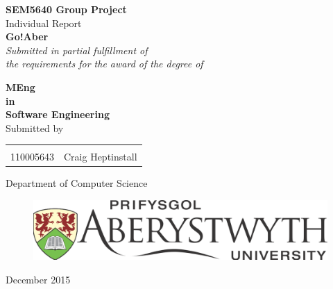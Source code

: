 \begin{titlepage}

\begin{center}

\textup{\small {\bf SEM5640 Group Project} \\ Individual Report}\\[0.2in]

\Large \textbf {Go!Aber}\\[0.5in]

       \small \emph{Submitted in partial fulfillment of\\
        the requirements for the award of the degree of}
        \vspace{.2in}

       {\bf MEng  \\in\\ Software Engineering}\\[0.5in]

\normalsize Submitted by \\
\begin{table}[h]
\centering
\begin{tabular}{lr}\hline \\
110005643 & Craig Heptinstall \\ \hline 
\end{tabular}
\end{table}

\vspace{.1in}

\Large{Department of Computer Science}\\
\vspace{.4in}
\normalsize
\begin{figure}[H]
\begin{center}
\includegraphics[scale=0.2]{images/Aberystwyth_University_logo.png} 
\end{center}
\end{figure}
December 2015

\end{center}

\end{titlepage}
